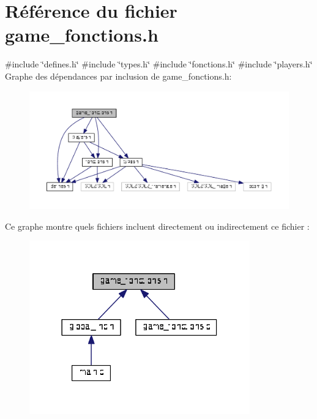 \section{Référence du fichier game\+\_\+fonctions.\+h}
\label{game__fonctions_8h}
{\ttfamily \#include \char`\"{}defines.\+h\char`\"{}}\newline
{\ttfamily \#include \char`\"{}types.\+h\char`\"{}}\newline
{\ttfamily \#include \char`\"{}fonctions.\+h\char`\"{}}\newline
{\ttfamily \#include \char`\"{}players.\+h\char`\"{}}\newline
Graphe des dépendances par inclusion de game\+\_\+fonctions.\+h\+:
\nopagebreak
\begin{figure}[H]
\begin{center}
\leavevmode
\includegraphics[width=350pt]{game__fonctions_8h__incl}
\end{center}
\end{figure}
Ce graphe montre quels fichiers incluent directement ou indirectement ce fichier \+:
\nopagebreak
\begin{figure}[H]
\begin{center}
\leavevmode
\includegraphics[width=270pt]{game__fonctions_8h__dep__incl}
\end{center}
\end{figure}
